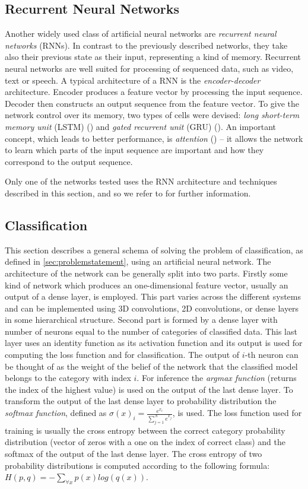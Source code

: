 \subsection{Recurrent Neural Networks}
\label{sec:rnns}
Another widely used class of artificial neural networks are \textit{recurrent neural networks} (RNNs). In contrast to the previously described networks, they take  also their previous state as their input, representing a kind of memory. Recurrent neural networks are well suited for processing of sequenced data, such as video, text or speech. A typical architecture of a RNN is the \textit{encoder-decoder} architecture. Encoder produces a feature vector by processing the input sequence. Decoder then constructs an output sequence from the feature vector. To give the network control over its memory, two types of cells were devised: \textit{long short-term memory unit} (LSTM) (\cite{hochreiter_long_1997}) and \textit{gated recurrent unit} (GRU) (\cite{cho_learning_2014}). An important concept, which leads to better performance, is \textit{attention} (\cite{bahdanau_neural_2014}) -- it allows the network to learn which parts of the input sequence are important and how they correspond to the output sequence.\par
Only one of the networks tested uses the RNN architecture and techniques described in this section, and  so we refer to \cite{goodfellow_deep_2016} for further information. 

\subsection{Classification}
This section describes a general schema of solving the problem of classification, as defined in \autoref{sec:problemstatement}, using an artificial neural network. The architecture of the network can be generally split into two parts. Firstly some kind of network which produces an one-dimensional feature vector, usually an output of a dense layer, is employed. This part varies across the different systems and can be implemented using 3D convolutions, 2D convolutions, or dense layers in some hierarchical structure.
Second part is formed by a dense layer with number of neurons equal to the number of categories of classified data. This last layer uses an identity function as its activation function and its output is used for computing the loss function and for classification. The output of $i$-th neuron can be thought of as the weight of the belief of the network that the classified model belongs to the category with index $i$. For inference the \textit{argmax function} (returns the index of the highest value) is used on the output of the last dense layer. To transform the output of the last dense layer to probability distribution the \textit{softmax function}, defined as $\sigma(x)_i = \frac{e^{x_i}}{\sum_{j=1}^{N}{e^{x_j}}} $, is used. The loss function used for training is usually the cross entropy between the correct category probability distribution (vector of zeros with a one on the index of correct class) and the softmax of the output of the last dense layer. The cross entropy of two probability distributions is computed according to the following formula: $H(p,q) = - \sum_{\forall x}{p(x)log(q(x))}$. 

